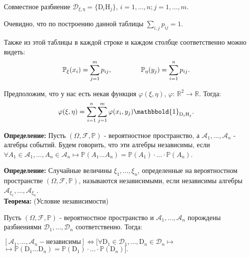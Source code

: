Совместное разбиение $\mathscr{D_{\xi , \eta}} = \{\text{D}_{i}\text{H}_{j}\}$, $i = 1, \dots , n; j = 1, \dots , m$.

Очевидно, что по построению данной таблицы $\sum\limits_{i,j}p_{ij} = 1$.

Также из этой таблицы в каждой строке и каждом столбце соответственно можно видеть:
\begin{equation*}
	\mathbb{P_{\xi}}(x_{i}) = \sum_{j = 1}^{m}p_{ij}, \hspace{15mm} \mathbb{P_{\eta}}(y_{j}) = \sum_{i = 1}^{n}p_{ij}.
\end{equation*}

Предположим, что у нас есть некая функция $\varphi (\xi , \eta)$, $\varphi$: $\mathbb{R}^2 \rightarrow \mathbb{R}$. Тогда:
\begin{equation*}
	\varphi (\xi , \eta) = \sum_{i = 1}^{n}\sum_{j = 1}^{m}\varphi (x_{i}, y_{j})\mathbbold{1}_{\text{D}_{i}\text{H}_{j}}.
\end{equation*}

\textbf{Определение:} Пусть $(\Omega , \mathscr{F} , \mathbb{P})$ - вероятностное пространство, а $\mathscr{A}_{1}, \dots ,\mathscr{A}_{n}$ - алгебры событий. Будем говорить, что эти алгебры независимы, если $\forall A_{1} \in \mathscr{A}_{1}, \dots , A_{n} \in \mathscr{A}_{n} \longmapsto \mathbb{P} (A_{1} ... A_{n}) = \mathbb{P} (A_{1})\cdot ...\cdot\mathbb{P} (A_{n})$.  
\vspace{5mm}

\textbf{Определение:} Случайные величины $\xi_{1}, \dots ,\xi_{n}$, определенные на вероятностном пространстве $(\Omega , \mathscr{F} , \mathbb{P})$, называются независимыми, если независимы алгебры $\mathscr{A}_{\xi_{1}}, \dots , \mathscr{A}_{\xi_{n}}$.\\

\textbf{Теорема:} (Условие независимости)

Пусть $(\Omega , \mathscr{F} , \mathbb{P})$ - вероятностное пространство и $\mathscr{A}_{1}, \dots ,\mathscr{A}_{n}$ порождены разбиениями $\mathscr{D}_{1}, \dots ,\mathscr{D}_{n}$ соответственно. Тогда:
\vspace{5mm}

$\left[\mathscr{A}_{1}, \dots ,\mathscr{A}_{n} - \text{независимы}\right] \Longleftrightarrow [\forall \text{D}_{1} \in \mathscr{D}_{1}, \dots , \text{D}_{n} \in \mathscr{D}_{n} \longmapsto$ \newline 
\indent $\longmapsto\mathbb{P} (\text{D}_{1}\dots \text{D}_{n}) = \mathbb{P} (\text{D}_{1})\cdot ...\cdot \mathbb{P} (\text{D}_{n})].$

